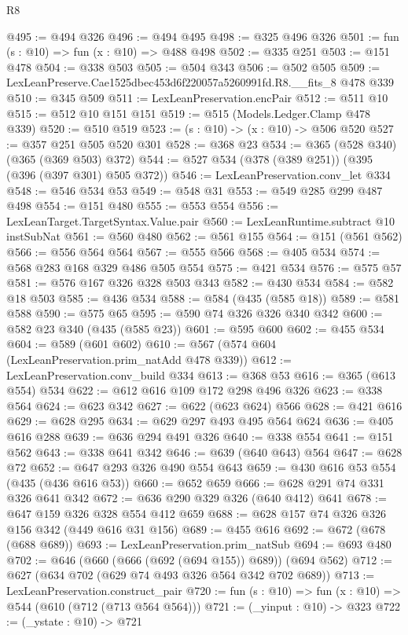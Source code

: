 \begin{lexlean}{R8}
\begin{coremodule}
@495 := @494 @326
@496 := @494 @495
@498 := @325 @496 @326
@501 := fun (s : @10) => fun (x : @10) => @488 @498
@502 := @335 @251
@503 := @151 @478
@504 := @338 @503
@505 := @504 @343
@506 := @502 @505
@509 := LexLeanPreserve.Cae1525dbec453d6f220057a5260991fd.R8.__fits_8 @478 @339
@510 := @345 @509
@511 := LexLeanPreservation.encPair
@512 := @511 @10
@515 := @512 @10 @151 @151
@519 := @515 (Models.Ledger.Clamp @478 @339)
@520 := @510 @519
@523 := (s : @10) -> (x : @10) -> @506 @520
@527 := @357 @251 @505 @520 @301
@528 := @368 @23
@534 := @365 (@528 @340) (@365 (@369 @503) @372)
@544 := @527 @534 (@378 (@389 @251)) (@395 (@396 (@397 @301) @505 @372))
@546 := LexLeanPreservation.conv_let @334
@548 := @546 @534 @53
@549 := @548 @31
@553 := @549 @285 @299 @487 @498
@554 := @151 @480
@555 := @553 @554
@556 := LexLeanTarget.TargetSyntax.Value.pair
@560 := LexLeanRuntime.subtract @10 instSubNat
@561 := @560 @480
@562 := @561 @155
@564 := @151 (@561 @562)
@566 := @556 @564 @564
@567 := @555 @566
@568 := @405 @534
@574 := @568 @283 @168 @329 @486 @505 @554
@575 := @421 @534
@576 := @575 @57
@581 := @576 @167 @326 @328 @503 @343
@582 := @430 @534
@584 := @582 @18 @503
@585 := @436 @534
@588 := @584 (@435 (@585 @18))
@589 := @581 @588
@590 := @575 @65
@595 := @590 @74 @326 @326 @340 @342
@600 := @582 @23 @340 (@435 (@585 @23))
@601 := @595 @600
@602 := @455 @534
@604 := @589 (@601 @602)
@610 := @567 (@574 @604 (LexLeanPreservation.prim_natAdd @478 @339))
@612 := LexLeanPreservation.conv_build @334
@613 := @368 @53
@616 := @365 (@613 @554) @534
@622 := @612 @616 @109 @172 @298 @496 @326
@623 := @338 @564
@624 := @623 @342
@627 := @622 (@623 @624) @566
@628 := @421 @616
@629 := @628 @295
@634 := @629 @297 @493 @495 @564 @624
@636 := @405 @616 @288
@639 := @636 @294 @491 @326
@640 := @338 @554
@641 := @151 @562
@643 := @338 @641 @342
@646 := @639 (@640 @643) @564
@647 := @628 @72
@652 := @647 @293 @326 @490 @554 @643
@659 := @430 @616 @53 @554 (@435 (@436 @616 @53))
@660 := @652 @659
@666 := @628 @291 @74 @331 @326 @641 @342
@672 := @636 @290 @329 @326 (@640 @412) @641
@678 := @647 @159 @326 @328 @554 @412 @659
@688 := @628 @157 @74 @326 @326 @156 @342 (@449 @616 @31 @156)
@689 := @455 @616
@692 := @672 (@678 (@688 @689))
@693 := LexLeanPreservation.prim_natSub
@694 := @693 @480
@702 := @646 (@660 (@666 (@692 (@694 @155)) @689)) (@694 @562)
@712 := @627 (@634 @702 (@629 @74 @493 @326 @564 @342 @702 @689))
@713 := LexLeanPreservation.construct_pair
@720 := fun (s : @10) => fun (x : @10) => @544 (@610 (@712 (@713 @564 @564)))
@721 := (_yinput : @10) -> @323
@722 := (_ystate : @10) -> @721

\end{coremodule}
\end{lexlean}
